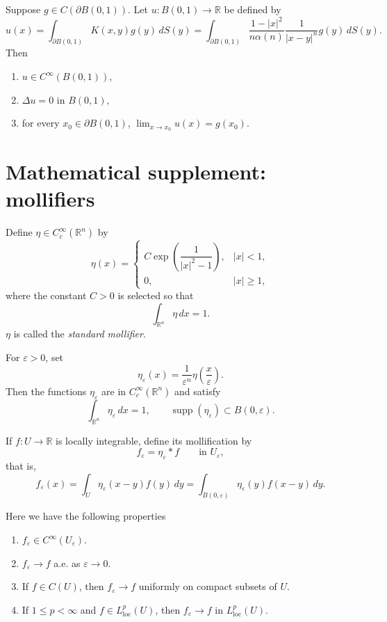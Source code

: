 \begin{theorem}
Suppose
$
g\in C(\partial B(0,1)).
$
Let $u:B(0,1)\to \mathbb{R}$ be defined by
$$
u(x)=\int_{\partial B(0,1)} K(x,y)g(y)\,dS(y)
=
\int_{\partial B(0,1)}
\frac{1-|x|^2}{n\alpha(n)}
\frac{1}{|x-y|^n}g(y)\,dS(y).
$$
Then
\begin{enumerate}
    \item $u\in C^\infty(B(0,1))$,
    \item $\Delta u=0$ in $B(0,1)$,
    \item for every $x_0\in \partial B(0,1)$,
    $
    \lim_{x\to x_0}u(x)=g(x_0).
    $
\end{enumerate}
\end{theorem}

\section{Mathematical supplement: mollifiers}

\begin{definition}
Define $\eta\in C_c^\infty(\mathbb{R}^n)$ by
$$
\eta(x)=
\begin{cases}
C\exp\!\left(\dfrac{1}{|x|^2-1}\right), & |x|<1,\\[1em]
0, & |x|\ge 1,
\end{cases}
$$
where the constant $C>0$ is selected so that
$$
\int_{\mathbb{R}^n}\eta\,dx=1.
$$
$\eta$ is called the \emph{standard mollifier}.
\end{definition}

\begin{definition}[Mollifier]
For $\varepsilon>0$, set
$$
\eta_\varepsilon(x)=\frac{1}{\varepsilon^n}\eta\!\left(\frac{x}{\varepsilon}\right).
$$
Then the functions $\eta_\varepsilon$ are in $C_c^\infty(\mathbb{R}^n)$ and satisfy
$$
\int_{\mathbb{R}^n}\eta_\varepsilon\,dx=1,
\qquad
\operatorname{supp}(\eta_\varepsilon)\subset B(0,\varepsilon).
$$
\end{definition}

\begin{definition}[Mollification]
If $f:U\to \mathbb{R}$ is locally integrable, define its mollification by
$$
f_\varepsilon=\eta_\varepsilon * f
\qquad \text{in } U_\varepsilon,
$$
that is,
$$
f_\varepsilon(x)
=
\int_U \eta_\varepsilon(x-y)f(y)\,dy
=
\int_{B(0,\varepsilon)} \eta_\varepsilon(y)f(x-y)\,dy.
$$
\end{definition}


\begin{theorem}
Here we have the following properties
\begin{enumerate}
    \item $f_\varepsilon\in C^\infty(U_\varepsilon)$.
    \item $f_\varepsilon\to f$ a.e. as $\varepsilon\to 0$.
    \item If $f\in C(U)$, then $f_\varepsilon\to f$ uniformly on compact subsets of $U$.
    \item If $1\le p<\infty$ and $f\in L^p_{\mathrm{loc}}(U)$, then
    $
    f_\varepsilon\to f \text{ in } L^p_{\mathrm{loc}}(U).
    $
\end{enumerate}
\end{theorem}

